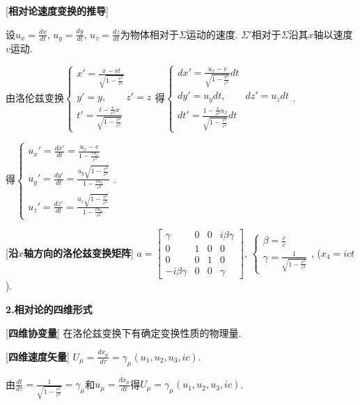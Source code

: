 [\textbf{相对论速度变换的推导}]\par
\qquad 设$u_x=\frac{dx}{dt}$, $u_y=\frac{dy}{dt}$, $u_z=\frac{dz}{dt}$为物体相对于$\Sigma$运动的速度. $\Sigma'$相对于$\Sigma$沿其$x$轴以速度$v$运动.\par
\qquad 由洛伦兹变换$\begin{cases}x'=\frac{x-vt}{\sqrt{1-\frac{v^2}{c^2}}}\\y'=y,\qquad z'=z\\t'=\frac{t-\frac{v}{c^2}x}{\sqrt{1-\frac{v^2}{c^2}}}\end{cases}$得$\begin{cases}dx'=\frac{u_x-v}{\sqrt{1-\frac{v^2}{c^2}}}dt\\dy'=u_ydt,\qquad dz'=u_zdt\\dt'=\frac{1-\frac{v}{c^2}u_x}{\sqrt{1-\frac{v^2}{c^2}}}dt\end{cases}$.\par
\qquad \qquad 得$\begin{cases}u_x'=\frac{dx'}{dt}=\frac{u_x-v}{1-\frac{vu_x}{c^2}}\\u_y'=\frac{dy'}{dt}=\frac{u_y\sqrt{1-\frac{v^2}{c^2}}}{1-\frac{vu_x}{c^2}}\\u_z'=\frac{dz'}{dt}=\frac{u_z\sqrt{1-\frac{v^2}{c^2}}}{1-\frac{vu_x}{c^2}}\end{cases}$.\par

[\textbf{沿$x$轴方向的洛伦兹变换矩阵}] $a=\left[\begin{matrix}\gamma&0&0&i\beta\gamma\\0&1&0&0\\0&0&1&0\\-i\beta\gamma&0&0&\gamma \end{matrix}\right]$, $\begin{cases}\beta=\frac{v}{c}\\\gamma=\frac{1}{\sqrt{1-\frac{v^2}{c^2}}}\end{cases}$, ($x_4=ict$).\par

\clearpage

\begin{center}
 \textbf{2.相对论的四维形式}
\end{center}

[\textbf{四维协变量}] 在洛伦兹变换下有确定变换性质的物理量.\par

[\textbf{四维速度矢量}] $U_\mu=\frac{dx_\mu}{d\tau}=\gamma_\mu(u_1,u_2,u_3,ic)$.\par
\qquad 由$\frac{dt}{d\tau}=\frac{1}{\sqrt{1-\frac{v^2}{c^2}}}=\gamma_\mu$和$u_\mu=\frac{dx_\mu}{dt}$得$U_\mu=\gamma_\mu(u_1,u_2,u_3,ic)$.\par

